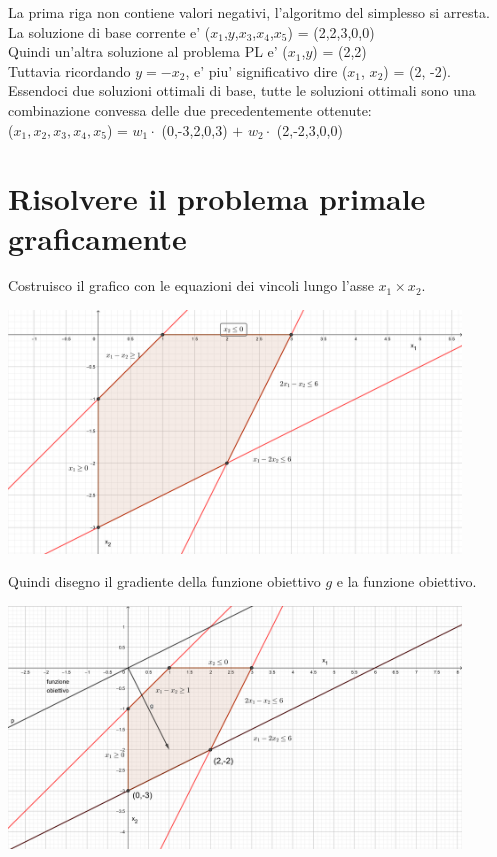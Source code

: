 \documentclass[a4paper,12pt,oneside]{article}
\begin{document}
    La prima riga non contiene valori negativi, l'algoritmo del simplesso si arresta. \\
    La soluzione di base corrente e' ($x_1$,$y$,$x_3$,$x_4$,$x_5$) = (2,2,3,0,0) \\
    Quindi un'altra soluzione al problema PL e' ($x_1$,$y$) = (2,2)\\
    Tuttavia ricordando $y = -x_2$, e' piu' significativo dire ($x_1$, $x_2$) = (2, -2). \\

    Essendoci due soluzioni ottimali di base, tutte le soluzioni ottimali sono una combinazione convessa delle due precedentemente ottenute: \\
    ($x_1, x_2, x_3, x_4, x_5$) = $w_1 \cdot $ (0,-3,2,0,3) $+$ $w_2 \cdot $ (2,-2,3,0,0)

    \newpage

    \section{Risolvere il problema primale graficamente}

    Costruisco il grafico con le equazioni dei vincoli lungo l'asse $x_1 \times x_2$.

    \begin{center}
        \includegraphics[width=12cm]{prima-fase.png}
    \end{center}

    Quindi disegno il gradiente della funzione obiettivo $g$ e la funzione obiettivo.

    \begin{center}
        \includegraphics[width=12cm]{seconda-fase.png}
    \end{center}
\end{document}
